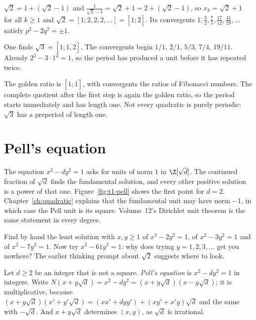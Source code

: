 \begin{example}
$\sqrt2=1+(\sqrt2-1)$ and $\frac1{\sqrt2-1}=\sqrt2+1=2+(\sqrt2-1)$, so $x_k=\sqrt2+1$ for all $k\ge1$ and $\sqrt2=[1;2,2,2,\dots]=[1;\overline2]$. Its convergents $1,\frac32,\frac75,\frac{17}{12},\frac{41}{29},\dots$ satisfy $p^2-2q^2=\pm1$.
\end{example}

\begin{examplex}
One finds $\sqrt 3=[1;\overline{1,2}]$. The convergents begin $1/1$, $2/1$, $5/3$, $7/4$, $19/11$. Already $2^2-3\cdot 1^2=1$, so the period has produced a unit before it has repeated twice.
\end{examplex}

\begin{examplex}
The golden ratio is $[1;\overline{1}]$, with convergents the ratios of Fibonacci numbers. The complete quotient after the first step is again the golden ratio, so the period starts immediately and has length one. Not every quadratic is purely periodic: $\sqrt 3$ has a preperiod of length one.
\end{examplex}

\section{Pell's equation}

The equation $x^2-dy^2=1$ asks for units of norm $1$ in $\Z[\sqrt d]$. The continued fraction of $\sqrt d$ finds the fundamental solution, and every other positive solution is a power of that one. Figure~\ref{fig:t1-pell} shows the first point for $d=2$. Chapter~\ref{ch:quadratic} explains that the fundamental unit may have norm $-1$, in which case the Pell unit is its square. Volume~12's Dirichlet unit theorem is the same statement in every degree.

\begin{think}
Find by hand the least solution with $x,y\ge1$ of $x^2-2y^2=1$, of $x^2-3y^2=1$ and of $x^2-7y^2=1$. Now try $x^2-61y^2=1$: why does trying $y=1,2,3,\dots$ get you nowhere? The earlier thinking prompt about $\sqrt2$ suggests where to look.
\end{think}

Let $d\ge2$ be an integer that is not a square. \emph{Pell's equation} is $x^2-dy^2=1$ in integers. Write $N(x+y\sqrt d)=x^2-dy^2=(x+y\sqrt d)(x-y\sqrt d)$; it is multiplicative, because $(x+y\sqrt d)(x'+y'\sqrt d)=(xx'+dyy')+(xy'+x'y)\sqrt d$ and the same with $-\sqrt d$. And $x+y\sqrt d$ determines $(x,y)$, as $\sqrt d$ is irrational.

